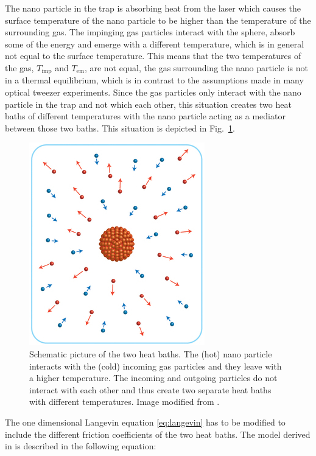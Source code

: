 \documentclass[12pt]{article}
\begin{document}
The nano particle in the trap is absorbing heat from the laser which causes the surface temperature of the nano particle to be higher than the 
temperature of the surrounding gas. The impinging gas particles interact with the sphere, absorb some of the energy and emerge with a different
temperature, which is in general not equal to the surface temperature. This means that
the two temperatures of the gas, $T_\text{imp}$ and $T_\text{em}$, are not equal, the gas surrounding the nano particle is not in a thermal
equilibrium, which is in contrast to the assumptions made in many optical tweezer experiments. 
Since the gas particles only interact with the nano particle
in the trap and not which each other, this situation creates two heat baths of different temperatures with the nano particle acting as a mediator
between those two baths. This situation is depicted in
Fig.~\ref{fig:heatbaths}.
\begin{figure}[H]
    \begin{center}
        \includegraphics[scale=0.5]{images/nano_nonequilibrium_cropped.jpg}
        \caption{Schematic picture of the two heat baths. The (hot) nano particle interacts with the (cold) incoming gas particles and they leave with
        a higher temperature. The incoming and outgoing particles do not interact with each other and thus create two separate heat baths with
    different temperatures. Image modified from \cite{Kroy2014}.}
        \label{fig:heatbaths}
    \end{center}
\end{figure}
The one dimensional Langevin equation \eqref{eq:langevin} has to be modified to include the different friction coefficients of the two heat baths. The
model derived in \cite{MillenJ.2014} is described in the following equation:
\end{document}
